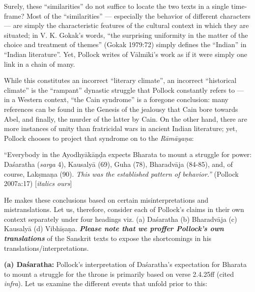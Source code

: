 Surely, these “similarities” do not suffice to locate the two texts in a single time-frame? Most of the “similarities” --- especially the behavior of different characters --- are simply the characteristic features of the cultural context in which they are situated; in V. K. Gokak’s words, “the surprising uniformity in the matter of the choice and treatment of themes” (Gokak 1979:72) simply defines the “Indian” in “Indian literature”. Yet, Pollock writes of Vālmīki’s work as if it were simply one link in a chain of many. 

While this constitutes an incorrect “literary climate”, an incorrect “historical climate” is the “rampant” dynastic struggle that Pollock constantly refers to --- in a Western context, “the Cain syndrome” is a foregone conclusion: many references can be found in the Genesis of the jealousy that Cain bore towards Abel, and finally, the murder of the latter by Cain. On the other hand, there are more instances of unity than fratricidal wars in ancient Indian literature; yet, Pollock chooses to project that syndrome on to the {\sl Rāmāyaṇa}: 

\begin{myquote}
“Everybody in the Ayodhyākāṇḍa expects Bharata to mount a struggle for power: Daśaratha ({\sl sarga} 4), Kausalyā (69), Guha (78), Bharadvāja (84-85), and, of course, Lakṣmaṇa (90). {\sl This was the established pattern of behavior.”}  
\hfill (Pollock 2007a:17) [{\sl italics ours}]
\end{myquote}

He makes these conclusions based on certain misinterpretations and mistranslations. Let us, therefore, consider each of Pollock’s claims in their own context separately under four headings viz. (a) Daśaratha (b) Bharadvāja (c) Kausalyā (d) Vibhīṣaṇa. {\sl\bfseries Please note that we proffer Pollock’s own translations} of the Sanskrit texts to expose the shortcomings in his translations/interpretations. 


\smallskip
\noindent
\textbf{(a) Daśaratha:} Pollock’s interpretation of Daśaratha’s expectation for Bharata to mount a struggle for the throne is primarily based on verse 2.4.25ff (cited {\sl infra}). Let us examine the different events that unfold prior to this: 

